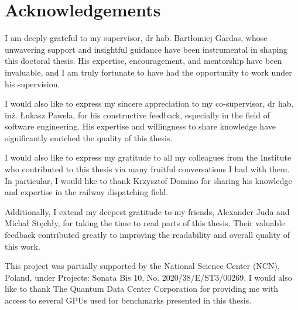 \chapter{Acknowledgements}

I am deeply grateful to my supervisor, dr hab. Bartłomiej Gardas, whose unwavering support and insightful guidance have been instrumental in shaping this doctoral thesis. His expertise, encouragement, and mentorship have been invaluable, and I am truly fortunate to have had the opportunity to work under his supervision.

I would also like to express my sincere appreciation to my co-supervisor, dr hab. inż. Łukasz Pawela, for his constructive feedback, especially in the field of software engineering. His expertise and willingness to share knowledge have significantly enriched the quality of this thesis.

I would also like to express my gratitude to all my colleagues from the Institute who contributed to this thesis via many fruitful conversations I had with them. In particular, I would like to thank Krzysztof Domino for sharing his knowledge and expertise in the railway dispatching field.

Additionally, I extend my deepest gratitude to my friends, Alexander Juda and Michał Stęchły, for taking the time to read parts of this thesis. Their valuable feedback contributed greatly to improving the readability and overall quality of this work.

This project was partially supported by the National Science Center (NCN), Poland, under Projects: Sonata Bis 10, No. 2020/38/E/ST3/00269. I would also like to thank The Quantum Data Center Corporation for providing me with access to several GPUs used for benchmarks presented in this thesis.

